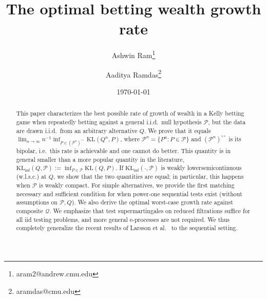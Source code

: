 \documentclass[11pt]{article}
\author[]{Ashwin Ram\thanks{aram2@andrew.cmu.edu} }
\author[]{Aaditya Ramdas\thanks{aramdas@cmu.edu}}
\affil[]{Carnegie Mellon University}
\title{The optimal betting wealth growth rate}
\date{\today}
\newcommand{\KL}{\mathrm{KL}}
\newcommand{\KLinf}{\mathrm{KL}_{\mathrm{inf}}}
\newcommand{\Pcal}{\mathcal{P}}
\newcommand{\Qcal}{\mathcal{Q}}
\theoremstyle{definition}
\theoremstyle{definition}
\begin{document}
\maketitle


\begin{abstract}
This paper characterizes the best possible rate of growth of wealth in a Kelly betting game when repeatedly betting against a general i.i.d.\ null hypothesis $\Pcal$, but the data are drawn i.i.d.\ from an arbitrary alternative $Q$. We prove that it equals $\lim_{n \to \infty}n^{-1}\inf_{P \in (\Pcal^n)^{\circ\circ}} \KL(Q^n,P)$, where $\Pcal^n = \{P^n: P \in \Pcal\}$ and $(\Pcal^n)^{\circ\circ}$ is its bipolar, i.e.\ this rate is achievable and one cannot do better.  This quantity is in general smaller than a more popular quantity in the literature, $\KLinf(Q,\Pcal) := \inf_{P \in \Pcal}\KL(Q,P)$. If $\KLinf(\cdot,\Pcal)$ is weakly lowersemicontinuous (w.l.s.c.) at $Q$, we show that the two quantities are equal; in particular, this happens when $\Pcal$ is weakly compact. For simple alternatives, we provide the first matching necessary and sufficient condition for when power-one sequential tests exist (without assumptions on $\Pcal, Q$).
We also derive the optimal worst-case growth rate against composite $\Qcal$. 
We emphasize that test supermartingales on reduced filtrations suffice for all iid testing problems, and more general e-processes are not required. 
We thus completely generalize the recent results of Larsson et al.~\cite{larsson2025numeraire} to the sequential setting.
\end{abstract}
\end{document}
